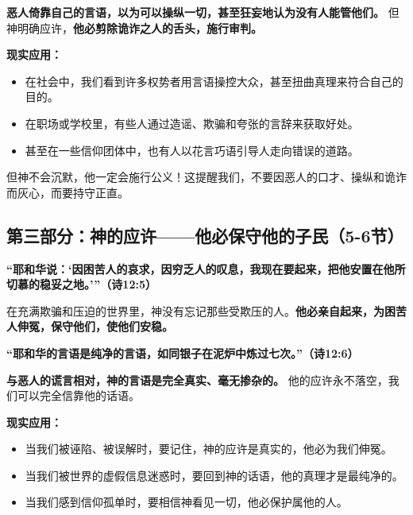\documentclass[a4paper, 12pt]{article}
\begin{document}
\vspace{0.2cm}

\textbf{恶人倚靠自己的言语，以为可以操纵一切，甚至狂妄地认为没有人能管他们。} 但神明确应许，\textbf{他必剪除诡诈之人的舌头，施行审判。  }

\vspace{0.2cm}

\textbf{现实应用：} 

\begin{itemize}
    \item 在社会中，我们看到许多权势者用言语操控大众，甚至扭曲真理来符合自己的目的。
    \item 在职场或学校里，有些人通过造谣、欺骗和夸张的言辞来获取好处。
    \item 甚至在一些信仰团体中，也有人以花言巧语引导人走向错误的道路。
\end{itemize}

但神不会沉默，他一定会施行公义！这提醒我们，不要因恶人的口才、操纵和诡诈而灰心，而要持守正直。  



\subsection*{第三部分：神的应许——他必保守他的子民（5-6节）}

\hspace{0.4cm}\textbf{“耶和华说：‘因困苦人的哀求，因穷乏人的叹息，我现在要起来，把他安置在他所切慕的稳妥之地。’”（诗12:5）  }

\vspace{0.2cm}

在充满欺骗和压迫的世界里，神没有忘记那些受欺压的人。\textbf{他必亲自起来，为困苦人伸冤，保守他们，使他们安稳。}  
  
\vspace{0.2cm}


\textbf{“耶和华的言语是纯净的言语，如同银子在泥炉中炼过七次。”（诗12:6）  
}

\vspace{0.2cm}

\textbf{与恶人的谎言相对，神的言语是完全真实、毫无掺杂的。} 他的应许永不落空，我们可以完全信靠他的话语。  

  
\vspace{0.2cm}

\textbf{现实应用：}

\begin{itemize}
    \item 当我们被诬陷、被误解时，要记住，神的应许是真实的，他必为我们伸冤。
    \item 当我们被世界的虚假信息迷惑时，要回到神的话语，他的真理才是最纯净的。
    \item 当我们感到信仰孤单时，要相信神看见一切，他必保护属他的人。
\end{itemize}
\end{document}
